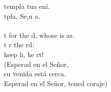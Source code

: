 \begin{cancion}%
	templa tua ení. \\
	tpla, Se,u a. \\
\jump\\
	t for the d, whose is ar. \\
	t r the rd: \\
	keep h, ke rt!\\
(Esperad en el Señor, \\
 su venida está cerca. \\
 Esperad en el Señor, tened coraje)\\
\end{cancion}%
